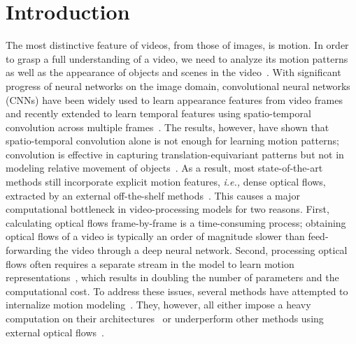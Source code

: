 \documentclass[runningheads]{llncs}
\begin{document}
\iffalse

\fi 
{}



\section{Introduction}
The most distinctive feature of videos, from those of images, is motion. 
In order to grasp a full understanding of a video, we need to analyze its motion patterns as well as the appearance of objects and scenes in the video~\cite{wang2011action,simonyan2014two,lee2018motion,piergiovanni2019representation}.
With significant progress of neural networks on the image domain, convolutional neural networks (CNNs) have been widely used to learn appearance features from video frames~\cite{simonyan2014two,wang2016temporal,tran2015learning,donahue2015long} and recently extended to learn temporal features using spatio-temporal convolution across multiple frames~\cite{carreira2017quo,tran2015learning}. 
The results, however, have shown that spatio-temporal convolution alone is not enough for learning motion patterns;
convolution is effective in capturing translation-equivariant patterns but not in modeling relative movement of objects~\cite{zhao2018trajectory,wang2015action}.
As a result, most state-of-the-art methods still incorporate explicit motion features, {\em i.e.,} dense optical flows, extracted by an external off-the-shelf methods~\cite{simonyan2014two,carreira2017quo,xie2018rethinking,tran2018closer,lin2019tsm}.
This causes a major computational bottleneck in video-processing models for two reasons.
First, calculating optical flows frame-by-frame is a time-consuming process; obtaining optical flows of a video is typically an order of magnitude slower than feed-forwarding the video through a deep neural network.
Second, processing optical flows often requires a separate stream in the model to learn motion representations~\cite{simonyan2014two}, which results in doubling the number of parameters and the computational cost. 
To address these issues, several methods have attempted to internalize motion modeling~\cite{sun2018optical,lee2018motion,fan2018end,piergiovanni2019representation}.
They, however, all either impose a heavy computation on their architectures~\cite{fan2018end,piergiovanni2019representation} or underperform other methods using external optical flows~\cite{sun2018optical,lee2018motion}.
\end{document}
